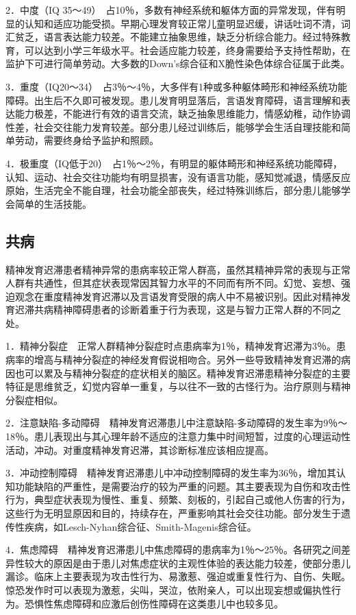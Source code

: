 2．中度（IQ
35～49）　占10％，多数有神经系统和躯体方面的异常发现，伴有明显的认知和适应功能受损。早期心理发育较正常儿童明显迟缓，讲话吐词不清，词汇贫乏，语言表达能力较差。不能建立抽象思维，缺乏分析综合能力。经过特殊教育，可以达到小学三年级水平。社会适应能力较差，终身需要给予支持性帮助，在监护下可进行简单劳动。大多数的Down's综合征和X脆性染色体综合征属于此类。

3．重度（IQ20～34）　占3％～4％，大多伴有1种或多种躯体畸形和神经系统功能障碍。出生后不久即可被发现。患儿发育明显落后，言语发育障碍，语言理解和表达能力极差，不能进行有效的语言交流，缺乏抽象思维能力，情感幼稚，动作协调性差，社会交往能力发育较差。部分患儿经过训练后，能够学会生活自理技能和简单劳动，需要终身给予监护和照顾。

4．极重度（IQ低于20）　占1％～2％，有明显的躯体畸形和神经系统功能障碍，认知、运动、社会交往功能均有明显损害，没有语言功能，感知觉减退，情感反应原始，生活完全不能自理，社会功能全部丧失，经过特殊训练后，部分患儿能够学会简单的生活技能。

\subsection{共病}

精神发育迟滞患者精神异常的患病率较正常人群高，虽然其精神异常的表现与正常人群有共通性，但其症状表现常因其智力水平的不同而有所不同。幻觉、妄想、强迫观念在重度精神发育迟滞以及言语发育受限的病人中不易被识别。因此对精神发育迟滞共病精神障碍患者的诊断着重于行为表现，这是与智力正常人群的不同之处。

1．精神分裂症　正常人群精神分裂症时点患病率为1％，精神发育迟滞为3％。患病率的增高与精神分裂症的神经发育假说相吻合。另外一些导致精神发育迟滞的病因也可以累及与精神分裂症的症状相关的脑区。精神发育迟滞患精神分裂症的主要特征是思维贫乏，幻觉内容单一重复，与以往不一致的古怪行为。治疗原则与精神分裂症相似。

2．注意缺陷-多动障碍　精神发育迟滞患儿中注意缺陷-多动障碍的发生率为9％～18％。患儿表现出与其心理年龄不适应的注意力集中时间短暂，过度的心理运动性活动，冲动。对重度精神发育迟滞，其诊断标准应该相应提高。

3．冲动控制障碍　精神发育迟滞患儿中冲动控制障碍的发生率为36％，增加其认知功能缺陷的严重性，是需要治疗的较为严重的问题。其主要表现为自伤和攻击性行为，典型症状表现为慢性、重复、频繁、刻板的，引起自己或他人伤害的行为，这些行为无明显原因和目的，持续存在，严重影响其社会交往功能。部分发生于遗传性疾病，如Lesch-Nyhan综合征、Smith-Magenis综合征。

4．焦虑障碍　精神发育迟滞患儿中焦虑障碍的患病率为1％～25％。各研究之间差异性较大的原因是由于患儿对焦虑症状的主观性体验的表达能力较差，使部分患儿漏诊。临床上主要表现为攻击性行为、易激惹、强迫或重复性行为、自伤、失眠。惊恐发作时可以表现为激惹，尖叫，哭泣，依附亲人，可以出现妄想或偏执性行为。恐惧性焦虑障碍和应激后创伤性障碍在这类患儿中也较多见。

